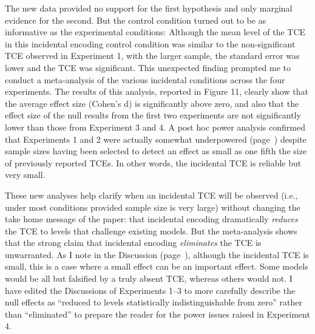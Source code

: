 \documentclass[12pt]{article}
\begin{document}
The new data provided no support for the first hypothesis and only marginal evidence for the second. But the control condition turned out to be as informative as the experimental conditions: Although the mean level of the TCE in this incidental encoding control condition was similar to the non-significant TCE observed in Experiment 1, with the larger sample, the standard error was lower and the TCE was significant. This unexpected finding prompted me to conduct a meta-analysis of the various incidental conditions across the four experiments. The results of this analysis, reported in Figure 11, clearly show that the average effect size (Cohen's d) is significantly above zero, and also that the effect size of the null results from the first two experiments are not significantly lower than those from Experiment 3 and 4. A post hoc power analysis confirmed that Experiments 1 and 2 were actually somewhat underpowered (page~\pageref{power}) despite sample sizes having been selected to detect an effect as small as one fifth the size of previously reported TCEs. In other words, the incidental TCE is reliable but very small.




These new analyses help clarify when an incidental TCE will be observed (i.e., under most conditions provided sample size is very large) without changing the take home message of the paper: that incidental encoding dramatically \emph{reduces} the TCE to levels that challenge existing models. But the meta-analysis shows that the strong claim that incidental encoding \emph{eliminates} the TCE is unwarranted. As I note in the Discussion (page~\pageref{zerovsnear}), although the incidental TCE is small, this is a case where a small effect can be an important effect. Some models would be all but falsified by a truly absent TCE, whereas others would not. I have edited the Discussions of Experiments 1--3 to more carefully describe the null effects as ``reduced to levels statistically indistinguishable from zero'' rather than ``eliminated'' to prepare the reader for the power issues raised in Experiment 4.
\end{document}
